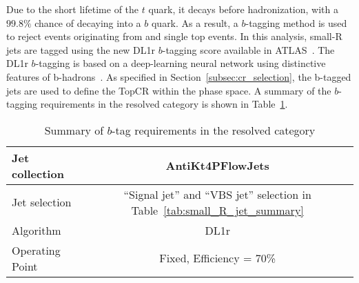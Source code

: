 \label{subsec:flavortagging}

Due to the short lifetime of the $t$ quark, it decays before hadronization, with a $99.8\%$ chance of decaying into a $b$ quark. 
As a result, a $b$-tagging method is used to reject events originating from \ttbar 
and single top events. 
In this analysis, small-R jets are tagged using the new DL1r $b$-tagging score available in ATLAS~\cite{FTAG-2018-01}.
The DL1r $b$-tagging is based on a deep-learning neural network using distinctive features of b-hadrons~\cite{Aad2023flavour}.
As specified in Section~\ref{subsec:cr_selection}, the b-tagged jets are used to define the TopCR within the \olep phase space.
A summary of the $b$-tagging requirements in the resolved category is shown in Table~\ref{tab:b_tag_resolved}.

\begin{table}[ht]
\begin{center}
\caption{Summary of $b$-tag requirements in the resolved category}
\label{tab:b_tag_resolved}
\begin{tabular}{|l|c|}\hline
Jet collection          & AntiKt4PFlowJets \\\hline
Jet selection           & ``Signal jet'' and ``VBS jet'' selection in Table~\ref{tab:small_R_jet_summary}    \\
                 \hline
Algorithm               & DL1r        \\\hline
Operating Point      & Fixed, Efficiency = 70\% \\\hline
\end{tabular}
\end{center}
\end{table}%

